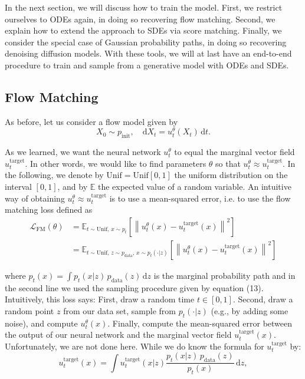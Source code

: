 In the next section, we will discuss how to train the model.
First, we restrict ourselves to ODEs again, in doing
so recovering flow matching. Second, we explain how to extend the approach to SDEs via score matching. Finally,
we consider the special case of Gaussian probability paths, in doing so recovering denoising diffusion models. With these tools, we will at last have an end-to-end procedure to train and sample from a generative model with ODEs and SDEs.

\subsection{Flow Matching}
As before, let us consider a flow model given by
\begin{equation}
X_0 \sim p_{\text{init}}, \quad \mathrm{d}X_t = u_t^\theta(X_t)\, \mathrm{d}t.
\end{equation}

As we learned, we want the neural network $u_t^\theta$ to equal the marginal vector field $u_t^{\text{target}}$. In other words, we would like to find parameters $\theta$ so that $u_t^\theta \approx u_t^{\text{target}}$. In the following, we denote by $\text{Unif} = \text{Unif}[0,1]$ the uniform distribution on the interval $[0,1]$, and by $\mathbb{E}$ the expected value of a random variable. An intuitive way of obtaining $u_t^\theta \approx u_t^{\text{target}}$ is to use a mean-squared error, i.e. to use the flow matching loss defined as
\begin{equation}
    \begin{aligned}
    \mathcal{L}_{\text{FM}}(\theta) &= \mathbb{E}_{t \sim \text{Unif},\, x \sim p_t} \left[ \left\| u_t^\theta(x) - u_t^{\text{target}}(x) \right\|^2 \right] \\
    &= \mathbb{E}_{t \sim \text{Unif},\, z \sim p_{\text{data}},\, x \sim p_t(\cdot | z)} \left[ \left\| u_t^\theta(x) - u_t^{\text{target}}(x) \right\|^2 \right]
    \end{aligned}
\end{equation}

where $p_t(x) = \int p_t(x|z)\, p_{\text{data}}(z)\, \mathrm{d}z$ is the marginal probability path and in the second line we used the sampling procedure given by equation (13). Intuitively, this loss says: First, draw a random time $t \in [0,1]$. Second, draw a random point $z$ from our data set, sample from $p_t(\cdot | z)$ (e.g., by adding some noise), and compute $u_t^\theta(x)$. Finally, compute the mean-squared error between the output of our neural network and the marginal vector field $u_t^{\text{target}}(x)$. Unfortunately, we are not done here. While we do know the formula for $u_t^{\text{target}}$ by: 
\begin{equation}
u_t^{\text{target}}(x) = \int u_t^{\text{target}}(x | z) \frac{p_t(x | z)\, p_{\text{data}}(z)}{p_t(x)}\, \mathrm{d}z,
\end{equation}

